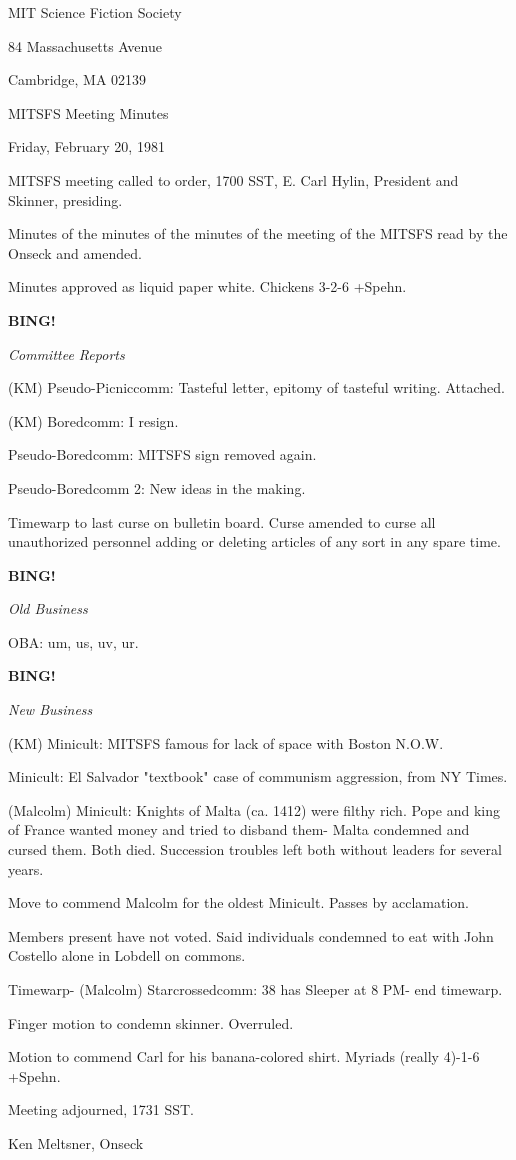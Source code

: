\documentclass[12pt]{article}
\newcommand{\bing}{{\bf BING!} }
\newcommand{\goto}[1]{\bing \vskip 12pt \centerline{{\em{#1}}}}
\begin{document}
\begin{center}

MIT Science Fiction Society 

84 Massachusetts Avenue

Cambridge, MA 02139

\vspace{12pt}

MITSFS Meeting Minutes 

Friday, February 20, 1981

\end{center}
 
\vspace{18pt}

\setlength{\parskip}{6pt}

\noindent
MITSFS meeting called to order, 1700 SST,
E. Carl Hylin, President and Skinner, presiding.

Minutes of the minutes of the minutes of the meeting of the MITSFS read by the Onseck and amended.

Minutes approved as liquid paper white. Chickens 3-2-6 +Spehn.

\goto{Committee Reports}

(KM) Pseudo-Picniccomm: Tasteful letter, epitomy of tasteful writing. Attached.

(KM) Boredcomm: I resign.

Pseudo-Boredcomm: MITSFS sign removed again.

Pseudo-Boredcomm 2: New ideas in the making.

Timewarp to last curse on bulletin board. Curse amended to curse all unauthorized personnel adding or deleting articles of any sort in any spare time.

\goto{Old Business}

OBA: um, us, uv, ur.

\goto{New Business}

(KM) Minicult: MITSFS famous for lack of space with Boston N.O.W.

Minicult: El Salvador "textbook" case of communism aggression, from NY Times.

(Malcolm) Minicult: Knights of Malta (ca. 1412) were filthy rich. Pope and king of France wanted money and tried to disband them- Malta condemned and cursed them. Both died. Succession troubles left both without leaders for several years.

Move to commend Malcolm for the oldest Minicult. Passes by acclamation.

Members present have not voted. Said individuals condemned to eat with John Costello alone in Lobdell on commons.

Timewarp- (Malcolm) Starcrossedcomm: 38 has Sleeper at 8 PM- end timewarp.

Finger motion to condemn skinner. Overruled.

Motion to commend Carl for his banana-colored shirt. Myriads (really 4)-1-6 +Spehn.

\vspace{12pt}

\noindent
Meeting adjourned, 1731 SST.

\vspace{18pt}

\centerline{Ken Meltsner, Onseck}
\end{document}
